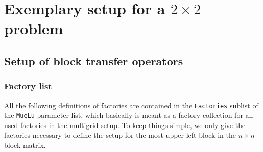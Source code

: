 \documentclass[10pt,fleqn]{book}
\begin{document}
\section{Exemplary setup for a $2\times 2$ problem}

\subsection{Setup of block transfer operators}
\label{sec:blocktransfersetup}

\subsubsection{Factory list}
All the following definitions of factories are contained in the \texttt{Factories} sublist of the \texttt{MueLu} parameter list, which basically is meant as a factory collection for all used factories in the multigrid setup.
To keep things simple, we only give the factories necessary to define the setup for the most upper-left block in the $n\times n$ block matrix.
\end{document}
